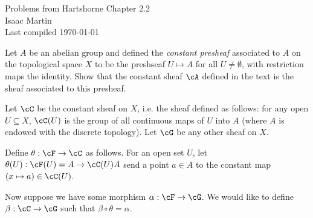 


\pagestyle{empty}
	\LARGE
\begin{center}
	Problems from Hartshorne Chapter 2.2 \\
	\Large
	Isaac Martin \\
    Last compiled \today
\end{center}
\normalsize
\vspace{-2mm}
\hru
\begin{homework}[e]
	\prob Let $A$ be an abelian group and defined the \emph{constant presheaf} associated to $A$ on the topological space $X$ to be the preshseaf $U\mapsto A$ for all $U\neq \emptyset$, with restriction maps the identity. Show that the constant sheaf $\cA$ defined in the text is the sheaf associated to this presheaf.
	\begin{prf}
		Let $\cC$ be the constant sheaf on $X$, i.e. the sheaf defined as follows: for any open $U\subseteq X$, $\cC(U)$ is the group of all continuous maps of $U$ into $A$ (where $A$ is endowed with the discrete topology). Let $\cG$ be any other sheaf on $X$.

		Define $\theta:\cF\to \cC$ as follows. For an open set $U$, let $\theta(U):\cF(U) = A\to \cC(U)A$ send a point $a \in A$ to the constant map $(x \mapsto a)\in \cC(U)$.

		Now suppose we have some morphism $\alpha:\cF\to \cG$. We would like to define $\beta:\cC\to \cG$ such that $\beta\circ\theta = \alpha$.


\end{prf}
\end{homework}
